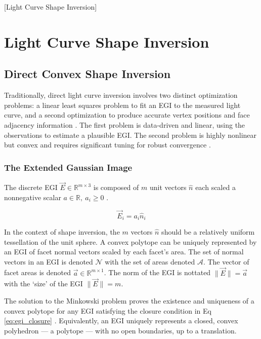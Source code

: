 [Light Curve Shape Inversion]
\graphicspath{{/Users/liamrobinson/Documents/msthesis/static_images/aas_2022_figs}}
\section{Light Curve Shape Inversion}

\subsection{Direct Convex Shape Inversion}

Traditionally, direct light curve inversion involves two distinct optimization problems: a linear least squares problem to fit an EGI to the measured light curve, and a second optimization to produce accurate vertex positions and face adjacency information \cite{fan2020thesis}. The first problem is data-driven and linear, using the observations to estimate a plausible EGI. The second problem is highly nonlinear but convex and requires significant tuning for robust convergence \cite{fan2019}.

\subsubsection{The Extended Gaussian Image} \label{sec:egi_definition}

The discrete EGI $\vec{E} \in \mathbb{R}^{m \times 3}$ is composed of $m$ unit vectors $\hat{n}$ each scaled a nonnegative scalar $a \in \mathbb{R}, \: a_i \geq 0$ \cite{little1983}.

\begin{equation}
  \vec{E}_i = a_i \hat{n}_i
\end{equation}

In the context of shape inversion, the $m$ vectors $\hat{n}$ should be a relatively uniform tessellation of the unit sphere. A convex polytope can be uniquely represented by an EGI of facet normal vectors scaled by each facet's area. The set of normal vectors in an EGI is denoted $\mathcal{N}$ with the set of areas denoted $\mathcal{A}$. The vector of facet areas is denoted $\vec{a} \in \mathbb{R}^{m \times 1}$. The norm of the EGI is nottated $\| \vec{E} \| = \vec{a}$ with the `size' of the EGI $\|\vec{E}\| = m$.

The solution to the Minkowski problem proves the existence and uniqueness of a convex polytope for any EGI satisfying the closure condition in Eq \ref{eq:egi_closure} \cite{minkowski1909}. Equivalently, an EGI uniquely represents a closed, convex polyhedron --- a polytope --- with no open boundaries, up to a translation.

